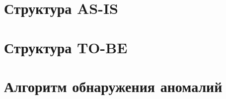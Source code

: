 
\section{Структура AS-IS}



\section{Структура TO-BE}



\section{Алгоритм обнаружения аномалий}

